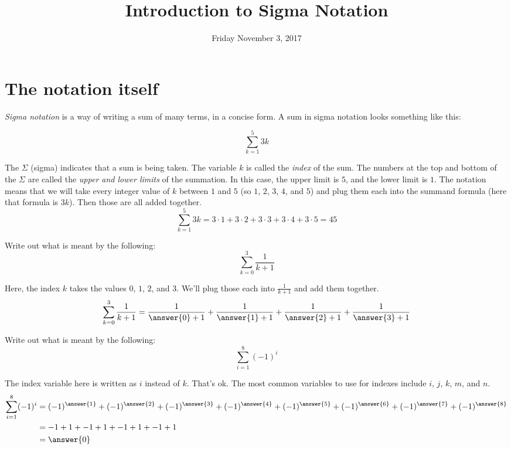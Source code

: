 \documentclass[12pt]{ximera}
\title{Introduction to Sigma Notation}
\date{Friday November 3, 2017}
\author{}
\theoremstyle{definition}
\newcommand{\hop}{\vskip 0.18in}
\begin{document}


\section{The notation itself}
\emph{Sigma notation} is a way of writing a sum of many terms, in a concise form.  A sum in sigma notation looks something like this:

\[ \sum_{k=1}^{5} 3k \]

The $\Sigma$ (sigma) indicates that a sum is being taken.  The variable $k$ is called the \emph{index} of the sum.  The numbers at the top and bottom of the $\Sigma$
are called the \emph{upper and lower limits} of the summation.  In this case, the upper limit is $5$, and the lower limit is $1$.  The notation means that we will take
every integer value of $k$ between $1$ and $5$ (so $1$, $2$, $3$, $4$, and $5$) and plug them each into the summand formula (here that formula is $3k$).
Then those are all added together.
\[ \sum_{k=1}^{5} 3k= 3\cdot 1 + 3\cdot 2 + 3\cdot 3 + 3\cdot 4 + 3\cdot 5 = 45 \]
\hop


\begin{example}
	Write out what is meant by the following:
	\[ \sum_{k=0}^{3} \frac{1}{k+1}\]
	\begin{explanation}
		Here, the index $k$ takes the values $0$, $1$, $2$, and $3$.  We'll plug those each into $\frac{1}{k+1}$ and add them together.
		\[\sum_{k=0}^3 \frac{1}{k+1} = \frac{1}{\answer{0}+1} + \frac{1}{\answer{1}+1} + \frac{1}{\answer{2}+1} + \frac{1}{\answer{3}+1} \]
	\end{explanation}
\end{example}


\hop

\begin{example}
	Write out what is meant by the following:
	\[ \sum_{i=1}^{8} \left(-1\right)^i \]
	\begin{explanation}
		The index variable here is written as $i$ instead of $k$.  That's ok.  The most common variables to use for indexes include $i$, $j$, $k$, $m$, and $n$.
		\begin{align*}
			\sum_{i=1}^8 (-1)^i &= (-1)^{\answer{1}} + (-1)^{\answer{2}} + (-1)^{\answer{3}} + (-1)^{\answer{4}} + (-1)^{\answer{5} }+ (-1)^{\answer{6}} + (-1)^{\answer{7}} + (-1)^{\answer{8}} \\
				&= -1 + 1 + -1 + 1 + -1 + 1 + -1 + 1\\
				&= \answer{0}
		\end{align*}	
	\end{explanation}
\end{example}
\hop
\end{document}
